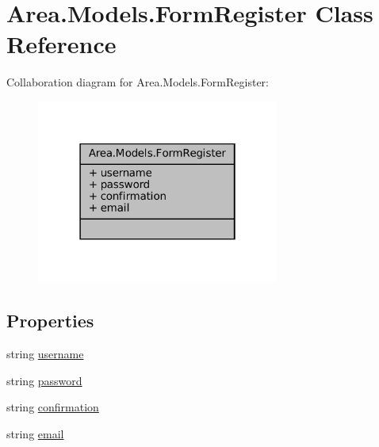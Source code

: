 \hypertarget{classArea_1_1Models_1_1FormRegister}{}\section{Area.\+Models.\+Form\+Register Class Reference}
\label{classArea_1_1Models_1_1FormRegister}


Collaboration diagram for Area.\+Models.\+Form\+Register\+:
\nopagebreak
\begin{figure}[H]
\begin{center}
\leavevmode
\includegraphics[width=226pt]{classArea_1_1Models_1_1FormRegister__coll__graph}
\end{center}
\end{figure}
\subsection*{Properties}
\begin{DoxyCompactItemize}
\item 
string \mbox{\hyperlink{classArea_1_1Models_1_1FormRegister_a065f953c377405bee288651cf6cec86c}{username}}
\item 
string \mbox{\hyperlink{classArea_1_1Models_1_1FormRegister_a329d7035be225b4713412da0a4f0cbe1}{password}}
\item 
string \mbox{\hyperlink{classArea_1_1Models_1_1FormRegister_a2bb8a77816c4952485a8821dc17fc5af}{confirmation}}
\item 
string \mbox{\hyperlink{classArea_1_1Models_1_1FormRegister_a57e3da2ac200f01b6cb4a1ac90cedd1b}{email}}
\end{DoxyCompactItemize}


